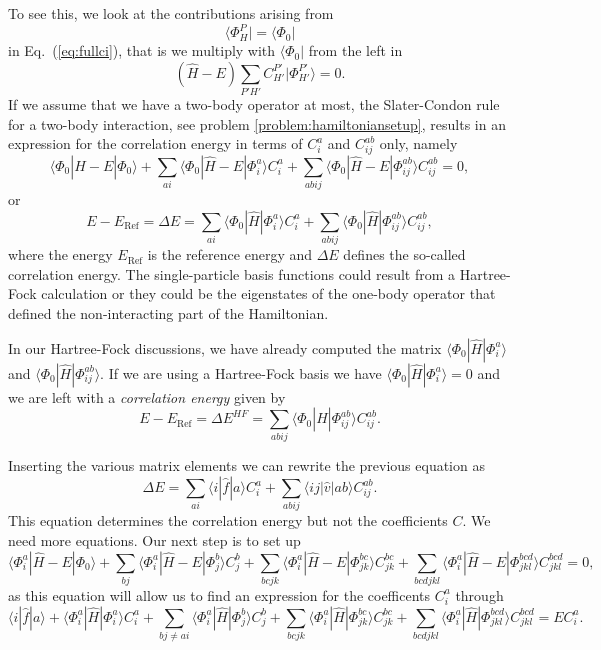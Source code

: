   To see this, we look at the contributions arising from
  \[
  \langle \Phi_H^P | = \langle \Phi_0|
  \]
  in Eq.~(\ref{eq:fullci}), that is we multiply with $\langle \Phi_0|$ from the left in
  \[
  (\hat{H} -E)\sum_{P'H'}C_{H'}^{P'}|\Phi_{H'}^{P'} \rangle=0.
  \]
  If we assume that we have a two-body operator at most, the
  Slater-Condon rule for a two-body interaction, see problem
  \ref{problem:hamiltoniansetup}, results in an expression for the
  correlation energy in terms of $C_i^a$ and $C_{ij}^{ab}$ only, namely
  \[
  \langle \Phi_0 | \hat{H} -E| \Phi_0\rangle + \sum_{ai}\langle \Phi_0
  | \hat{H} -E|\Phi_{i}^{a} \rangle C_{i}^{a}+ \sum_{abij}\langle
  \Phi_0 | \hat{H} -E|\Phi_{ij}^{ab} \rangle C_{ij}^{ab}=0,
  \]
  or
  \[
  E-E_{\mathrm{Ref}} =\Delta E=\sum_{ai}\langle \Phi_0 |
  \hat{H}|\Phi_{i}^{a} \rangle C_{i}^{a}+ \sum_{abij}\langle \Phi_0 |
  \hat{H}|\Phi_{ij}^{ab} \rangle C_{ij}^{ab},
  \]
  where the energy $E_{\mathrm{Ref}}$ is the reference energy and
  $\Delta E$ defines the so-called correlation energy.  The
  single-particle basis functions could  result from  a
  Hartree-Fock calculation or they could be the eigenstates of the one-body operator that defined the
  non-interacting part of the Hamiltonian.

  In our Hartree-Fock discussions, we have already computed
  the matrix $\langle \Phi_0 | \hat{H}|\Phi_{i}^{a}\rangle $ and
  $\langle \Phi_0 | \hat{H}|\Phi_{ij}^{ab}\rangle$.  If we are using a
  Hartree-Fock basis we have $\langle \Phi_0 | \hat{H}|\Phi_{i}^{a}\rangle=0$
  and we are left with a \emph{correlation energy} given by
  \[
  E-E_{\mathrm{Ref}} =\Delta E^{HF}=\sum_{abij}\langle \Phi_0 |
  \hat{H}|\Phi_{ij}^{ab} \rangle C_{ij}^{ab}.
  \]


  Inserting the various matrix elements we can rewrite the previous
  equation as
  \begin{equation}\label{eq:correlationenergy}
  \Delta E=\sum_{ai}\langle i| \hat{f}|a \rangle C_{i}^{a}+
  \sum_{abij}\langle ij | \hat{v}| ab \rangle C_{ij}^{ab}.
  \end{equation}
  This equation determines the correlation energy but not the
  coefficients $C$.  We need more equations. Our next step is to set
  up
  \[ 
  \langle \Phi_i^a | \hat{H} -E| \Phi_0\rangle + \sum_{bj}\langle
  \Phi_i^a | \hat{H} -E|\Phi_{j}^{b} \rangle C_{j}^{b}+
  \sum_{bcjk}\langle \Phi_i^a | \hat{H} -E|\Phi_{jk}^{bc} \rangle
  C_{jk}^{bc}+ \sum_{bcdjkl}\langle \Phi_i^a | \hat{H}
  -E|\Phi_{jkl}^{bcd} \rangle C_{jkl}^{bcd}=0,
  \]
  as this equation will allow us to find an expression for the
  coefficents $C_i^a$  through 
  \begin{equation}\label{eq:c1p1h}
  \langle i | \hat{f}| a\rangle +\langle \Phi_i^a |
  \hat{H}|\Phi_{i}^{a} \rangle C_{i}^{a}+ \sum_{bj\ne ai}\langle
  \Phi_i^a | \hat{H}|\Phi_{j}^{b} \rangle C_{j}^{b}+
  \sum_{bcjk}\langle \Phi_i^a | \hat{H}|\Phi_{jk}^{bc} \rangle
  C_{jk}^{bc}+ \sum_{bcdjkl}\langle \Phi_i^a |
  \hat{H}|\Phi_{jkl}^{bcd} \rangle C_{jkl}^{bcd}=EC_i^a.
  \end{equation}


